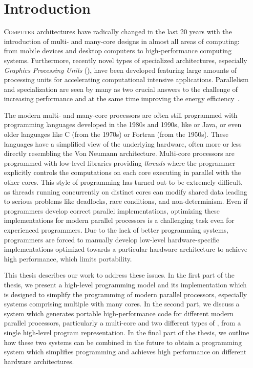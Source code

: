 
\chapter{Introduction} %

\label{ch:introduction} %

\lettrine[lines=3, loversize=0.1]{C}{omputer} architectures have radically changed in the last 20 years with the introduction of multi- and many-core designs in almost all areas of computing:
from mobile devices and desktop computers to high-performance computing systems.
Furthermore, recently novel types of specialized architectures, especially \emph{Graphics Processing Units} (\GPUs), have been developed featuring large amounts of processing units for accelerating computational intensive applications.
Parallelism and specialization are seen by many as two crucial answers to the challenge of increasing performance and at the same time improving the energy efficiency~\cite{OlukotunH05,GarlandK10}.

The modern multi- and many-core processors are often still programmed with programming languages developed in the 1980s and 1990s, like \Cpp or Java, or even older languages like C (from the 1970s) or Fortran (from the 1950s).
These languages have a simplified view of the underlying hardware, often more or less directly resembling the Von Neumann architecture.
Multi-core processors are programmed with low-level libraries providing \emph{threads} where the programmer explicitly controls the computations on each core executing in parallel with the other cores.
This style of programming has turned out to be extremely difficult, as threads running concurrently on distinct cores can modify shared data leading to serious problems like deadlocks, race conditions, and non-determinism.
Even if programmers develop correct parallel implementations, optimizing these implementations for modern parallel processors is a challenging task even for experienced programmers.
Due to the lack of better programming systems, programmers are forced to manually develop low-level hardware-specific implementations optimized towards a particular hardware architecture to achieve high performance, which limits portability.

This thesis describes our work to address these issues.
In the first part of the thesis, we present a high-level programming model and its implementation which is designed to simplify the programming of modern parallel processors, especially systems comprising multiple \GPUs with many cores.
In the second part, we discuss a system which generates portable high-performance code for different modern parallel processors, particularly a multi-core \CPU and two different types of \GPUs, from a single high-level program representation.
In the final part of the thesis, we outline how these two systems can be combined in the future to obtain a programming system which simplifies programming and achieves high performance on different hardware architectures.

